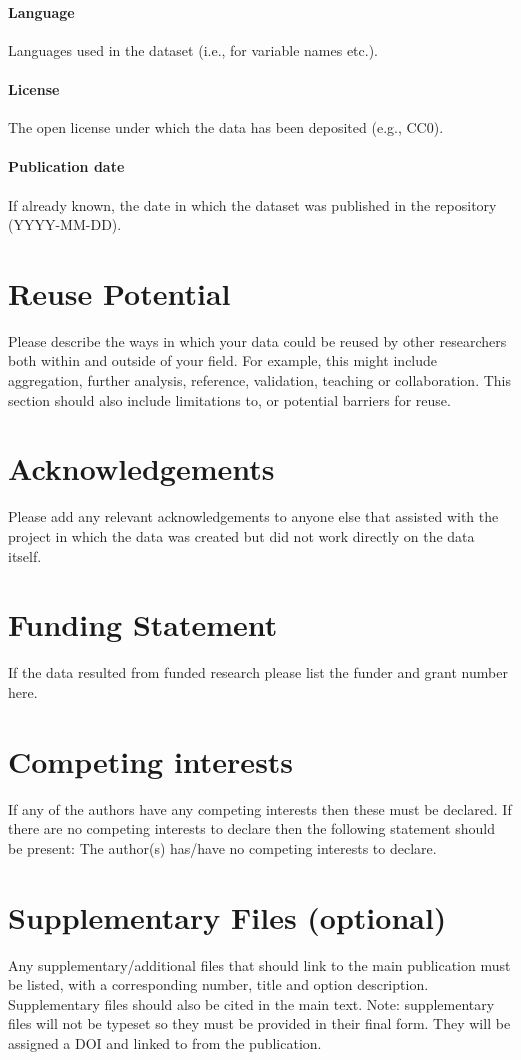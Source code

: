 \documentclass{article}
\begin{document}
\paragraph{Language} Languages used in the dataset (i.e., for variable names etc.).
\paragraph{License} The open license under which the data has been deposited (e.g., CC0). 
\paragraph{Publication date} If already known, the date in which the dataset was published in the repository (YYYY-MM-DD).

\section{Reuse Potential}
Please describe the ways in which your data could be reused by other researchers both within and outside of your field. For example, this might include aggregation, further analysis, reference, validation, teaching or collaboration. This section should also include limitations to, or potential barriers for reuse.

\section*{Acknowledgements}
Please add any relevant acknowledgements to anyone else that assisted with the project in which the data was created but did not work directly on the data itself.

\section*{Funding Statement}
If the data resulted from funded research please list the funder and grant number here.

\section*{Competing interests} 
If any of the authors have any competing interests then these must be declared. If there are no competing interests to declare then the following statement should be present: The author(s) has/have no competing interests to declare.




\section*{Supplementary Files (optional)}
Any supplementary/additional files that should link to the main publication must be listed, with a corresponding number, title and option description. Supplementary files should also be cited in the main text.
Note: supplementary files will not be typeset so they must be provided in their final form. They will be assigned a DOI and linked to from the publication.
\end{document}
